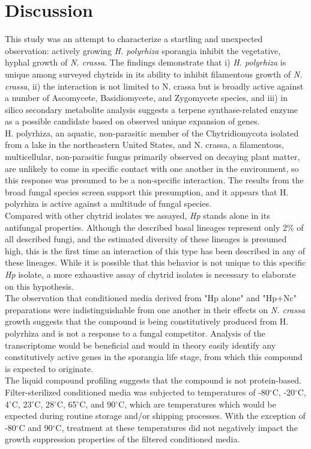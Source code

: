 \section{Discussion}
This study was an attempt to characterize a startling and unexpected observation: actively growing \textit{H. polyrhiza} sporangia inhibit the vegetative, hyphal growth of \textit{N. crassa}. The findings demonstrate that i) \textit{H. polyrhiza} is unique among surveyed chytrids in its ability to inhibit filamentous growth of \textit{N. crassa}, ii) the interaction is not limited to N. crassa but is broadly active against a number of Ascomycete, Basidiomycete, and Zygomycete species, and iii) in silico secondary metabolite analysis suggests a terpene synthase-related enzyme as a possible candidate based on observed unique expansion of genes.\\
\indent H. polyrhiza, an aquatic, non-parasitic member of the Chytridiomycota isolated from a lake in the northeastern United States, and N. crassa, a filamentous, multicellular, non-parasitic fungus primarily observed on decaying plant matter, are unlikely to come in specific contact with one another in the environment, so this response was presumed to be a non-specific interaction. The results from the broad fungal species screen support this presumption, and it appears that H. polyrhiza is active against a multitude of fungal species.\\
\indent Compared with other chytrid isolates we assayed, \textit{Hp} stands alone in its antifungal properties. Although the described basal lineages represent only 2\% of all described fungi, and the estimated diversity of these lineages is presumed high, this is the first time an interaction of this type has been described in any of these lineages. While it is possible that this behavior is not unique to this specific \textit{Hp} isolate, a more exhaustive assay of chytrid isolates is necessary to elaborate on this hypothesis.\\
\indent The observation that conditioned media derived from "Hp alone" and "Hp+Nc" preparations were indistinguishable from one another in their effects on \textit{N. crassa} growth suggests that the compound is being constitutively produced from H. polyrhiza and is not a response to a fungal competitor. Analysis of the transcriptome would be beneficial and would in theory easily identify any constitutively active genes in the sporangia life stage, from which this compound is expected to originate.\\
\indent The liquid compound profiling suggests that the compound is not protein-based. Filter-sterilized conditioned media was subjected to temperatures of -80$^{\circ}$C, -20$^{\circ}$C, 4$^{\circ}$C, 23$^{\circ}$C, 28$^{\circ}$C, 65$^{\circ}$C, and 90$^{\circ}$C, which are temperatures which would be expected during routine storage and/or shipping processes. With the exception of -80$^{\circ}$C and 90$^{\circ}$C, treatment at these temperatures did not negatively impact the growth suppression properties of the filtered conditioned media.\\
